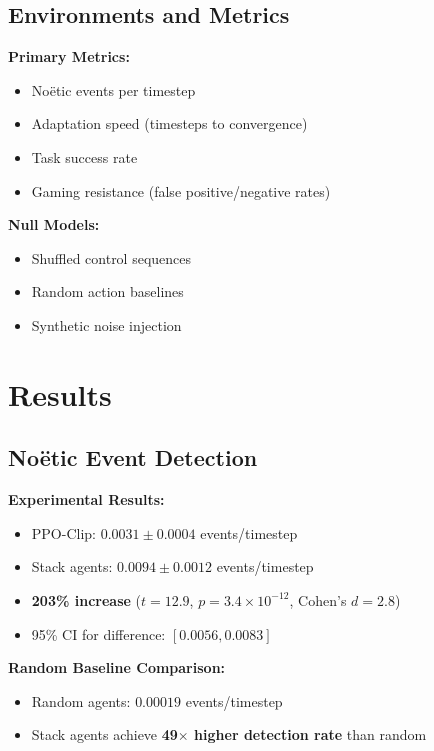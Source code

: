 \documentclass[11pt]{article}
\begin{document}
\subsection{Environments and Metrics}

\textbf{Primary Metrics:}
\begin{itemize}
    \item Noëtic events per timestep
    \item Adaptation speed (timesteps to convergence)
    \item Task success rate
    \item Gaming resistance (false positive/negative rates)
\end{itemize}

\textbf{Null Models:}
\begin{itemize}
    \item Shuffled control sequences
    \item Random action baselines
    \item Synthetic noise injection
\end{itemize}

\section{Results}

\subsection{Noëtic Event Detection}

\textbf{Experimental Results:}
\begin{itemize}
    \item PPO-Clip: $0.0031 \pm 0.0004$ events/timestep
    \item Stack agents: $0.0094 \pm 0.0012$ events/timestep
    \item \textbf{203\% increase} ($t = 12.9$, $p = 3.4 \times 10^{-12}$, Cohen's $d = 2.8$)
    \item 95\% CI for difference: $[0.0056, 0.0083]$
\end{itemize}

\textbf{Random Baseline Comparison:}
\begin{itemize}
    \item Random agents: $0.00019$ events/timestep
    \item Stack agents achieve \textbf{49$\times$ higher detection rate} than random
\end{itemize}
\end{document}
